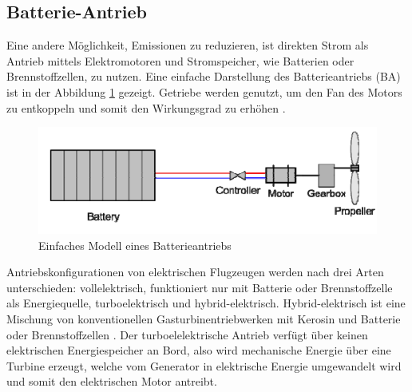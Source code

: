 \subsection{Batterie-Antrieb}
Eine andere Möglichkeit, Emissionen zu reduzieren, ist direkten Strom als Antrieb 
mittels Elektromotoren und Stromspeicher, wie Batterien oder Brennstoffzellen, zu nutzen.
Eine einfache Darstellung des Batterieantriebs (BA) ist in der Abbildung \ref{ba} gezeigt. 
Getriebe werden genutzt, um den Fan des Motors zu entkoppeln und somit den Wirkungsgrad zu erhöhen \cite{hepperle2012electric}.
%
\begin{figure}[h]
	\centering
	\includegraphics[width=0.7\linewidth]{Bilder/BA.png}
	\caption[Einfaches Modell eines Batterieantriebs]{Einfaches Modell eines Batterieantriebs \cite{hepperle2012electric}}
	\label{ba}
\end{figure}

Antriebskonfigurationen von elektrischen Flugzeugen werden nach drei Arten unterschieden: 
vollelektrisch, funktioniert nur mit Batterie oder Brennstoffzelle als Energiequelle, 
turboelektrisch und hybrid-elektrisch. 
Hybrid-elektrisch ist eine Mischung von konventionellen Gasturbinentriebwerken mit Kerosin 
und Batterie oder Brennstoffzellen \cite{dahal2021techno}. 
Der turboelelektrische Antrieb verfügt über keinen elektrischen Energiespeicher an Bord, 
also wird mechanische Energie über eine Turbine erzeugt, welche vom Generator in elektrische Energie 
umgewandelt wird und somit den elektrischen Motor antreibt. %

